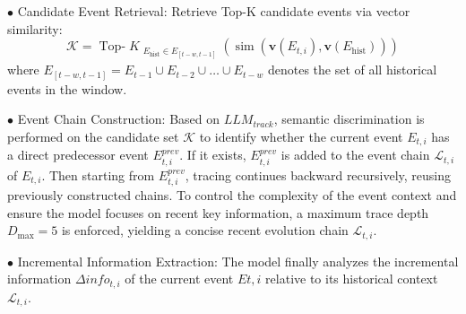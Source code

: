 \documentclass[sigconf, nonacm]{acmart} %
\begin{document}
$\bullet$ Candidate Event Retrieval: Retrieve Top-K candidate events via vector similarity:
\begin{equation}
    \mathcal{K} = \operatorname{Top-}K_{\substack{E_{\mathrm{hist}} \in E_{[t-w, t-1]}}} \left( \operatorname{sim}(\mathbf{v}(E_{t,i}), \mathbf{v}(E_{\mathrm{hist}})) \right)
\end{equation}
where $E_{[t-w, t-1]} = E_{t-1} \cup E_{t-2} \cup \dots \cup E_{t-w}$ denotes the set of all historical events in the window.

$\bullet$ Event Chain Construction: 
Based on $LLM_{track}$, semantic discrimination is performed on the candidate set $\mathcal{K}$ to identify whether the current event $E_{t,i}$ has a direct predecessor event $E^{prev}_{t,i}$. If it exists, $E^{prev}_{t,i}$ is added to the event chain $\mathcal{L}_{t,i}$ of $E_{t,i}$. 
Then starting from $E^{prev}_{t,i}$, tracing continues backward recursively, reusing previously constructed chains. 
To control the complexity of the event context and ensure the model focuses on recent key information, 
a maximum trace depth $D_{\text{max}} = 5$ is enforced, yielding a concise recent evolution chain $\mathcal{L}_{t,i}$.

$\bullet$ Incremental Information Extraction: 
The model finally analyzes the incremental information $\Delta info_{t,i}$ of the current event $E{t,i}$ relative to its historical context $\mathcal{L}_{t,i}$.
\end{document}
